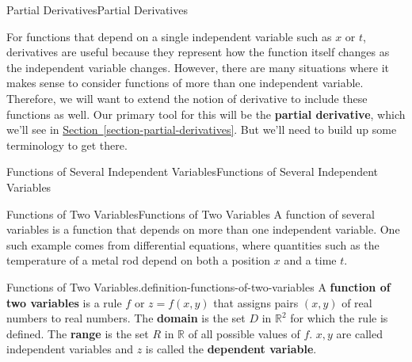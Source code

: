 \documentclass[10pt,]{book}
\newcommand{\terminology}[1]{\textbf{#1}}
\numberwithin{equation}{section}
\newcommand{\RR}{\mathbb{R}}
\begin{document}
\begin{chapterptx}{Partial Derivatives}{}{Partial Derivatives}{}{}\label{partial-derivatives}
\begin{introduction}{}%
\hypertarget{p-1110}{}%
For functions that depend on a single independent variable such as \(x\) or \(t\), derivatives are useful because they represent how the function itself changes as the independent variable changes. However, there are many situations where it makes sense to consider functions of more than one independent variable. Therefore, we will want to extend the notion of derivative to include these functions as well. Our primary tool for this will be the \terminology{partial derivative}, which we'll see in \hyperref[section-partial-derivatives]{Section~\ref{section-partial-derivatives}}. But we'll need to build up some terminology to get there.%
\end{introduction}%
%
%
\typeout{************************************************}
\typeout{************************************************}
%
\begin{sectionptx}{Functions of Several Independent Variables}{}{Functions of Several Independent Variables}{}{}\label{section-functions-of-several-independent-variables}
%
%
\typeout{************************************************}
\typeout{************************************************}
%
\begin{subsectionptx}{Functions of Two Variables}{}{Functions of Two Variables}{}{}\label{subsection-functions-of-two-variables}
\hypertarget{p-1111}{}%
A function of several variables is a function that depends on more than one independent variable. One such example comes from differential equations, where quantities such as the temperature of a metal rod depend on both a position \(x\) and a time \(t\).%
\begin{definition}{Functions of Two Variables.}{definition-functions-of-two-variables}%
\hypertarget{p-1112}{}%
A \terminology{function of two variables} is a rule \(f\) or \(z = f(x,y)\) that assigns pairs \((x,y)\) of real numbers to real numbers. The \terminology{domain} is the set \(D\) in \(\RR^{2}\) for which the rule is defined. The \terminology{range} is the set \(R\) in \(\RR\) of all possible values of \(f\). \(x,y\) are called independent variables and \(z\) is called the \terminology{dependent variable}.%
\end{definition}

\end{subsectionptx}
\end{sectionptx}
\end{chapterptx}
\end{document}
